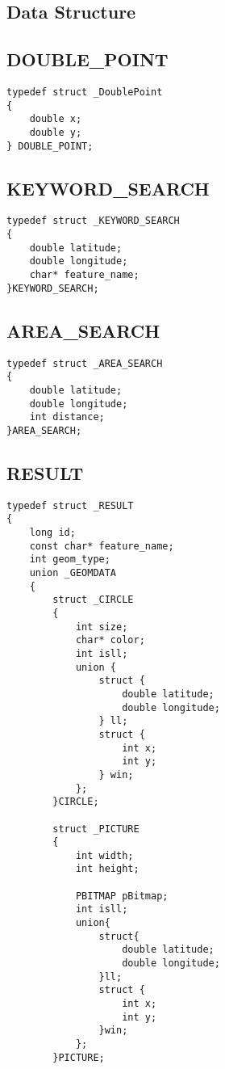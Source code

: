 \documentclass[a4paper]{article}
\begin{document}
\newpage

\begin{appendix}

\section{Data Structure}

\subsection{DOUBLE\_POINT}
\begin{lstlisting}
typedef struct _DoublePoint
{
    double x;
    double y;
} DOUBLE_POINT;
\end{lstlisting}

\subsection{KEYWORD\_SEARCH}
\begin{lstlisting}
typedef struct _KEYWORD_SEARCH
{
    double latitude;
    double longitude;
    char* feature_name;
}KEYWORD_SEARCH;
\end{lstlisting}

\subsection{AREA\_SEARCH}
\begin{lstlisting}
typedef struct _AREA_SEARCH
{
    double latitude;
    double longitude;
    int distance;
}AREA_SEARCH;
\end{lstlisting}


\subsection{RESULT}
\begin{lstlisting}
typedef struct _RESULT
{
    long id;
    const char* feature_name;
    int geom_type;
    union _GEOMDATA
    {
        struct _CIRCLE
        {
            int size;
            char* color;
            int isll;
            union {
                struct {
                    double latitude;
                    double longitude;
                } ll;
                struct {
                    int x;
                    int y;
                } win;
            };
        }CIRCLE;

        struct _PICTURE
        {
            int width;
            int height;

            PBITMAP pBitmap;
            int isll;
            union{
                struct{
                    double latitude;
                    double longitude;
                }ll;
                struct {
                    int x;
                    int y;
                }win;
            };
        }PICTURE;


\end{lstlisting}
\end{appendix}
\end{document}
